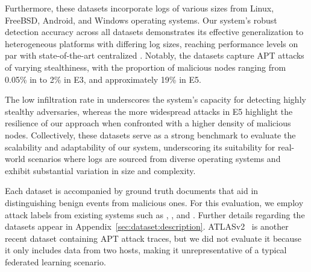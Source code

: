 Furthermore, these datasets incorporate logs of various sizes from Linux, FreeBSD, Android, and Windows operating systems. Our system’s robust detection accuracy across all datasets demonstrates its effective generalization to heterogeneous platforms with differing log sizes, reaching performance levels on par with state-of-the-art centralized \pids. Notably, the datasets capture APT attacks of varying stealthiness, with the proportion of malicious nodes ranging from 0.05\% in \optc to 2\% in E3, and approximately 19\% in E5.

The low infiltration rate in \optc underscores the system’s capacity for detecting highly stealthy adversaries, whereas the more widespread attacks in E5 highlight the resilience of our approach when confronted with a higher density of malicious nodes. Collectively, these datasets serve as a strong benchmark to evaluate the scalability and adaptability of our system, underscoring its suitability for real-world scenarios where logs are sourced from diverse operating systems and exhibit substantial variation in size and complexity.

Each \darpa dataset is accompanied by ground truth documents that aid in distinguishing benign events from malicious ones. For this evaluation, we employ attack labels from existing systems such as \threatrace, \kairos, and \flash. Further details regarding the datasets appear in Appendix~\ref{sec:dataset:description}. ATLASv2~\cite{riddle2023atlasv2} is another recent dataset containing APT attack traces, but we did not evaluate it because it only includes data from two hosts, making it unrepresentative of a typical federated learning scenario.

